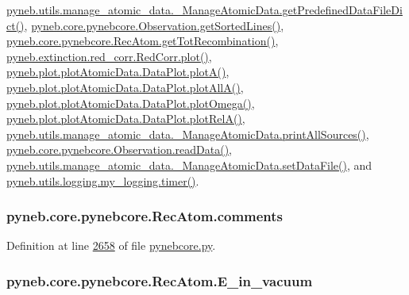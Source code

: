 \hyperlink{manage__atomic__data_8py_source_l00034}{pyneb.\-utils.\-manage\-\_\-atomic\-\_\-data.\-\_\-\-Manage\-Atomic\-Data.\-get\-Predefined\-Data\-File\-Dict()}, \hyperlink{pynebcore_8py_source_l03684}{pyneb.\-core.\-pynebcore.\-Observation.\-get\-Sorted\-Lines()}, \hyperlink{pynebcore_8py_source_l02851}{pyneb.\-core.\-pynebcore.\-Rec\-Atom.\-get\-Tot\-Recombination()}, \hyperlink{red__corr_8py_source_l00303}{pyneb.\-extinction.\-red\-\_\-corr.\-Red\-Corr.\-plot()}, \hyperlink{plot_atomic_data_8py_source_l00117}{pyneb.\-plot.\-plot\-Atomic\-Data.\-Data\-Plot.\-plot\-A()}, \hyperlink{plot_atomic_data_8py_source_l00189}{pyneb.\-plot.\-plot\-Atomic\-Data.\-Data\-Plot.\-plot\-All\-A()}, \hyperlink{plot_atomic_data_8py_source_l00373}{pyneb.\-plot.\-plot\-Atomic\-Data.\-Data\-Plot.\-plot\-Omega()}, \hyperlink{plot_atomic_data_8py_source_l00262}{pyneb.\-plot.\-plot\-Atomic\-Data.\-Data\-Plot.\-plot\-Rel\-A()}, \hyperlink{manage__atomic__data_8py_source_l00431}{pyneb.\-utils.\-manage\-\_\-atomic\-\_\-data.\-\_\-\-Manage\-Atomic\-Data.\-print\-All\-Sources()}, \hyperlink{pynebcore_8py_source_l03711}{pyneb.\-core.\-pynebcore.\-Observation.\-read\-Data()}, \hyperlink{manage__atomic__data_8py_source_l00380}{pyneb.\-utils.\-manage\-\_\-atomic\-\_\-data.\-\_\-\-Manage\-Atomic\-Data.\-set\-Data\-File()}, and \hyperlink{logging_8py_source_l00115}{pyneb.\-utils.\-logging.\-my\-\_\-logging.\-timer()}.

\hypertarget{classpyneb_1_1core_1_1pynebcore_1_1_rec_atom_ada8efc5b9724d1c0e76bd7c63508803e}{
\subsubsection[{comments}]{\setlength{\rightskip}{0pt plus 5cm}pyneb.\-core.\-pynebcore.\-Rec\-Atom.\-comments}}\label{classpyneb_1_1core_1_1pynebcore_1_1_rec_atom_ada8efc5b9724d1c0e76bd7c63508803e}


Definition at line \hyperlink{pynebcore_8py_source_l02658}{2658} of file \hyperlink{pynebcore_8py_source}{pynebcore.\-py}.

\hypertarget{classpyneb_1_1core_1_1pynebcore_1_1_rec_atom_ad8b22dbde0d9861d94cf7aeacf0d93be}{
\subsubsection[{E\-\_\-in\-\_\-vacuum}]{\setlength{\rightskip}{0pt plus 5cm}pyneb.\-core.\-pynebcore.\-Rec\-Atom.\-E\-\_\-in\-\_\-vacuum}}\label{classpyneb_1_1core_1_1pynebcore_1_1_rec_atom_ad8b22dbde0d9861d94cf7aeacf0d93be}


